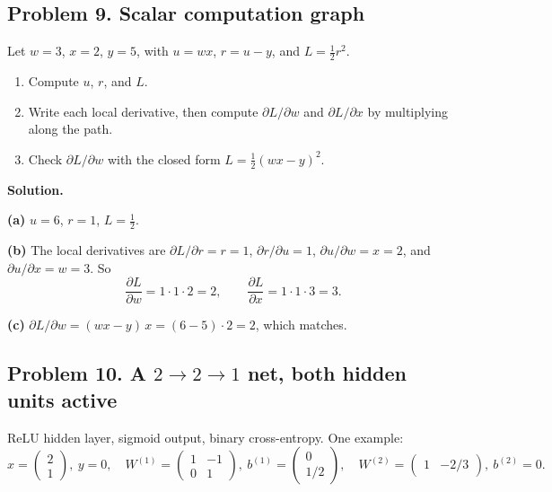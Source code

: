 \subsection*{Problem 9. Scalar computation graph}

Let $w = 3$, $x = 2$, $y = 5$, with $u = wx$, $r = u - y$, and $L = \frac12 r^2$.

\begin{enumerate}[label=(\alph*)]
\item Compute $u$, $r$, and $L$.
\item Write each local derivative, then compute $\partial L/\partial w$ and $\partial L/\partial x$ by multiplying along the path.
\item Check $\partial L/\partial w$ with the closed form $L = \frac12(wx - y)^2$.
\end{enumerate}

\textbf{Solution.}

\textbf{(a)} $u = 6$, $r = 1$, $L = \tfrac12$.

\textbf{(b)} The local derivatives are $\partial L/\partial r = r = 1$, $\partial r/\partial u = 1$, $\partial u/\partial w = x = 2$, and $\partial u/\partial x = w = 3$. So
\[
\frac{\partial L}{\partial w} = 1\cdot 1\cdot 2 = 2,\qquad \frac{\partial L}{\partial x} = 1\cdot 1\cdot 3 = 3.
\]

\textbf{(c)} $\partial L/\partial w = (wx - y)\,x = (6 - 5)\cdot 2 = 2$, which matches.

\subsection*{Problem 10. A $2\to2\to1$ net, both hidden units active}

ReLU hidden layer, sigmoid output, binary cross-entropy. One example:
\[
x = \begin{pmatrix}2\\1\end{pmatrix},\ y = 0,\quad W^{(1)} = \begin{pmatrix}1 & -1\\ 0 & 1\end{pmatrix},\ b^{(1)} = \begin{pmatrix}0\\1/2\end{pmatrix},\quad W^{(2)} = \begin{pmatrix}1 & -2/3\end{pmatrix},\ b^{(2)} = 0.
\]

